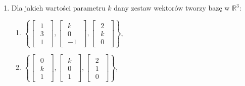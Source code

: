 \documentclass{article}
\begin{document}
\begin{enumerate}
    \item Dla jakich wartości parametru $k$ dany zestaw wektorów tworzy bazę w $\mathbb{R}^{3}$:
        \begin{enumerate}
            \item $\left\{ \begin{bmatrix}\begin{array}{r} 1\\ 3\\ 1 \end{array}\end{bmatrix},          \begin{bmatrix}\begin{array}{r} k\\ 0\\ -1 \end{array}\end{bmatrix}, 
            \begin{bmatrix}\begin{array}{r} 2\\ k\\ 0 \end{array}\end{bmatrix}\right\}$,

            \item $\left\{ \begin{bmatrix}\begin{array}{r} 0\\ k\\ 1 \end{array}\end{bmatrix},          \begin{bmatrix}\begin{array}{r} k\\ 0\\ 1 \end{array}\end{bmatrix}, 
            \begin{bmatrix}\begin{array}{r} 2\\ 1\\ 0 \end{array}\end{bmatrix}\right\}$,


\end{enumerate}
\end{enumerate}
\end{document}
